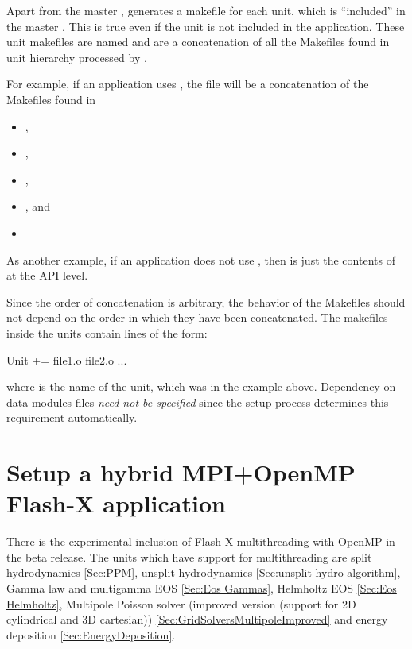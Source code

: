 Apart from the master , \setup generates a makefile for
each unit, which is ``included'' in the master . This
is true even if the unit is not included in the application. These
unit makefiles  are named  and are a concatenation
of all the Makefiles found in unit hierarchy processed by \setup.

For example, if an application uses
, the file 
\newline
{}
will be a concatenation of the Makefiles found in
\begin{itemize}
\item {},
\item {},
\item {},
\item {}, and
\item {}
\end{itemize}

As another example, if an application does not use , then
 is just the contents of
 at the API level.

Since the order of concatenation is arbitrary, the behavior of the
Makefiles should not depend on the order in which they have been
concatenated. The makefiles inside the units contain lines of the form:
\begin{codeseg}
Unit += file1.o file2.o ...
\end{codeseg}

\noindent where  is the name of the unit, which was  in
the example above.  Dependency on data
modules files \emph{need not be specified} since the setup process
determines this requirement automatically.

\section{Setup a hybrid MPI+OpenMP Flash-X application}
\label{Sec:hybridSetup}

There is the experimental inclusion of Flash-X multithreading with
OpenMP in the \flashx beta release.  The units which have support
for multithreading are split hydrodynamics \ref{Sec:PPM}, unsplit
hydrodynamics \ref{Sec:unsplit hydro algorithm}, Gamma law and
multigamma EOS \ref{Sec:Eos Gammas}, Helmholtz EOS \ref{Sec:Eos Helmholtz}, 
Multipole Poisson solver (improved version (support for
2D cylindrical and 3D cartesian))
\ref{Sec:GridSolversMultipoleImproved} and energy deposition
\ref{Sec:EnergyDeposition}.

